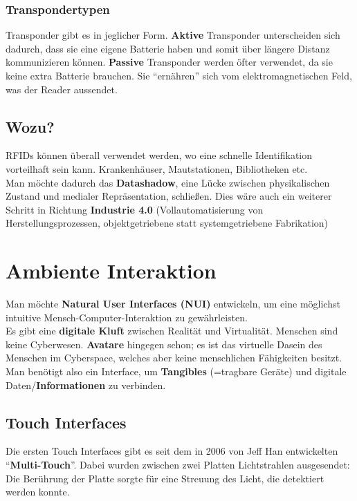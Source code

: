 \documentclass[a4paper]{article}
\begin{document}
\subsubsection{Transpondertypen}
Transponder gibt es in jeglicher Form. \textbf{Aktive} Transponder unterscheiden sich dadurch, dass sie eine eigene Batterie haben und somit über längere Distanz kommunizieren können. \textbf{Passive} Transponder werden öfter verwendet, da sie keine extra Batterie brauchen. Sie ``ernähren'' sich vom elektromagnetischen Feld, was der Reader aussendet.

\subsection{Wozu?}
RFIDs können überall verwendet werden, wo eine schnelle Identifikation vorteilhaft sein kann. Krankenhäuser, Mautstationen, Bibliotheken etc.\\

Man möchte dadurch das \textbf{Datashadow}, eine Lücke zwischen physikalischen Zustand und medialer Repräsentation, schließen. Dies wäre auch ein weiterer Schritt in Richtung \textbf{Industrie 4.0} (Vollautomatisierung von Herstellungsprozessen, objektgetriebene statt systemgetriebene Fabrikation)

\newpage
\section{Ambiente Interaktion}
Man möchte \textbf{Natural User Interfaces (NUI)} entwickeln, um eine möglichst intuitive Mensch-Computer-Interaktion zu gewährleisten.\\
Es gibt eine \textbf{digitale Kluft} zwischen Realität und Virtualität. Menschen sind keine Cyberwesen. \textbf{Avatare} hingegen schon; es ist das virtuelle Dasein des Menschen im Cyberspace, welches aber keine menschlichen Fähigkeiten besitzt. Man benötigt also ein Interface, um \textbf{Tangibles} (=tragbare Geräte) und digitale Daten/\textbf{Informationen} zu verbinden.

\subsection{Touch Interfaces}
Die ersten Touch Interfaces gibt es seit dem in 2006 von Jeff Han entwickelten ``\textbf{Multi-Touch}''. Dabei wurden zwischen zwei Platten Lichtstrahlen ausgesendet: Die Berührung der Platte sorgte für eine Streuung des Licht, die detektiert werden konnte.
\end{document}
